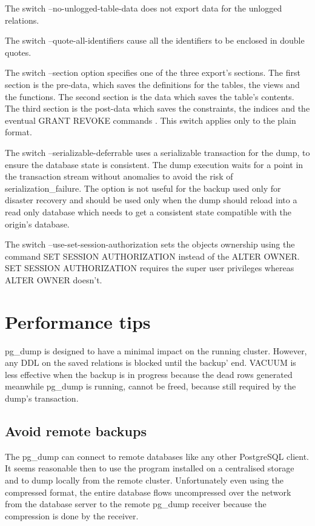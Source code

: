 The switch  --no-unlogged-table-data does not export data for the unlogged relations.\newline

The switch  --quote-all-identifiers  cause all the identifiers to be enclosed in double quotes. \newline

The switch --section option specifies one of the three export's sections. The first section is the
pre-data, which saves the definitions for the tables, the views and the functions. The second section is the
data which saves the table's contents. The third section is the post-data which saves the constraints, the
indices and the eventual GRANT REVOKE commands . This switch applies only to the plain format. \newline

The switch --serializable-deferrable uses a serializable transaction for the dump, to ensure the database
state is consistent. The dump execution waits for a point in the transaction stream without
anomalies to avoid the risk of serialization\_failure. The option is not useful for the backup used
only for disaster recovery and should be used only when the dump should reload into a read only database
which needs to get a consistent state compatible with the origin's database.\newline

The switch --use-set-session-authorization sets the objects ownership using the command SET SESSION
AUTHORIZATION instead of the ALTER OWNER. SET SESSION AUTHORIZATION requires the super user privileges
whereas ALTER OWNER doesn't.


\section{Performance tips}
pg\_dump is designed to have a minimal impact on the running cluster.  However, any DDL on the saved
relations is blocked until the backup' end. VACUUM is less effective when the backup is in progress because
the dead rows generated meanwhile pg\_dump is running, cannot be freed, because still required by the
dump's transaction.\newline

\subsection{Avoid remote backups}
The pg\_dump can connect to remote databases like any other PostgreSQL client. It seems reasonable then to
use the program installed on a centralised storage and to dump locally from the remote cluster.
Unfortunately even using the compressed format, the entire database flows uncompressed over the network
from the database server to the remote pg\_dump receiver because the compression is done by the
receiver.\newline

